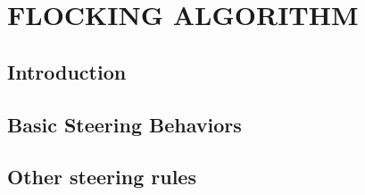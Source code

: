 \chapter{FLOCKING ALGORITHM}

\section{Introduction}

\section{Basic Steering Behaviors}

\section{Other steering rules}



